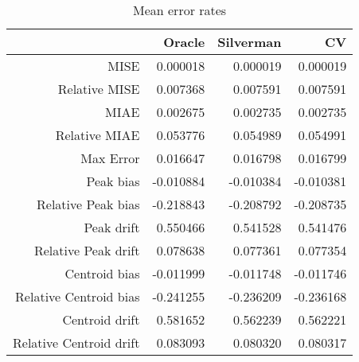 \begin{table}[ht]
\centering
\begin{tabular}{rrrr}
  \hline
 & Oracle & Silverman & CV \\ 
  \hline
MISE & 0.000018 & 0.000019 & 0.000019 \\ 
  Relative MISE & 0.007368 & 0.007591 & 0.007591 \\ 
  MIAE & 0.002675 & 0.002735 & 0.002735 \\ 
  Relative MIAE & 0.053776 & 0.054989 & 0.054991 \\ 
  Max Error & 0.016647 & 0.016798 & 0.016799 \\ 
  Peak bias & -0.010884 & -0.010384 & -0.010381 \\ 
  Relative Peak bias & -0.218843 & -0.208792 & -0.208735 \\ 
  Peak drift & 0.550466 & 0.541528 & 0.541476 \\ 
  Relative Peak drift & 0.078638 & 0.077361 & 0.077354 \\ 
  Centroid bias & -0.011999 & -0.011748 & -0.011746 \\ 
  Relative Centroid bias & -0.241255 & -0.236209 & -0.236168 \\ 
  Centroid drift & 0.581652 & 0.562239 & 0.562221 \\ 
  Relative Centroid drift & 0.083093 & 0.080320 & 0.080317 \\ 
   \hline
\end{tabular}
\caption{Mean error rates} 
\label{tbl:mean_error_rates}
\end{table}
